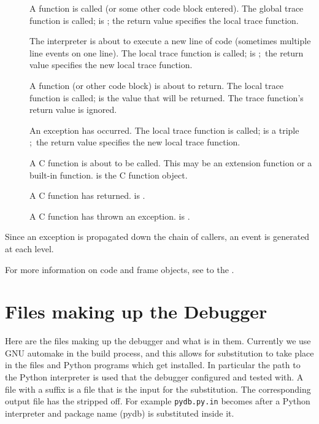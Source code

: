 \begin{description}

\item[]
A function is called (or some other code block entered).  The global
trace function is called;  is ;
the return value specifies the local trace function.

\item[]
The interpreter is about to execute a new line of code (sometimes
multiple line events on one line).  The local trace function is
called;  is ;\ the return value specifies the new
local trace function.

\item[]
A function (or other code block) is about to return.  The local trace
function is called;  is the value that will be returned.  The
trace function's return value is ignored.

\item[]
An exception has occurred.  The local trace function is called;
 is a triple ;\ the return value specifies the new local trace
function.

\item[]
A C function is about to be called.  This may be an extension function
or a built-in function.   is the C function object.

\item[]
A C function has returned.  is .

\item[]
A C function has thrown an exception.   is .

\end{description}

Since an exception is propagated down the chain of callers, an
 event is generated at each level.

For more information on code and frame objects, see to the
.

\section{Files making up the Debugger \label{debugger-files}}

Here are the files making up the debugger and what is in
them. Currently we use GNU automake in the build process, and this
allows for substitution to take place in the files and Python programs
which get installed. In particular the path to the Python interpreter
is used that the debugger configured and tested with. A file with a
 suffix is a file that is the input for the
substitution. The corresponding output file has the 
stripped off. For example {\tt pydb.py.in} becomes 
after a Python interpreter and package name (pydb) is substituted
inside it.


